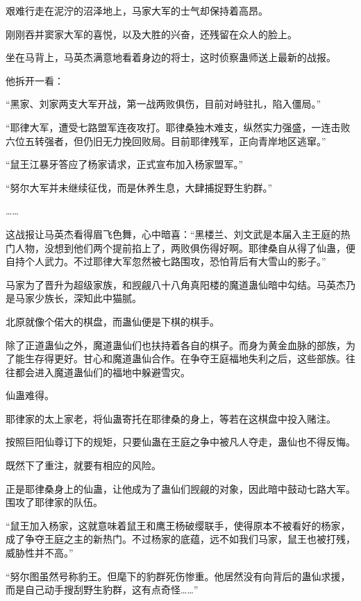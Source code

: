 
\begin{this_body}

艰难行走在泥泞的沼泽地上，马家大军的士气却保持着高昂。

刚刚吞并窦家大军的喜悦，以及大胜的兴奋，还残留在众人的脸上。

坐在马背上，马英杰满意地看着身边的将士，这时侦察蛊师送上最新的战报。

他拆开一看：

“黑家、刘家两支大军开战，第一战两败俱伤，目前对峙驻扎，陷入僵局。”

“耶律大军，遭受七路盟军连夜攻打。耶律桑独木难支，纵然实力强盛，一连击败六位五转强者，但仍旧无力挽回败局。目前耶律残军，正向青岸地区逃窜。”

“鼠王江暴牙答应了杨家请求，正式宣布加入杨家盟军。”

“努尔大军并未继续征伐，而是休养生息，大肆捕捉野生豹群。”

……

这战报让马英杰看得眉飞色舞，心中暗喜：“黑楼兰、刘文武是本届入主王庭的热门人物，没想到他们两个提前掐上了，两败俱伤得好啊。耶律桑自从得了仙蛊，便自持个人武力。不过耶律大军忽然被七路围攻，恐怕背后有大雪山的影子。”

马家为了晋升为超级家族，和觊觎八十八角真阳楼的魔道蛊仙暗中勾结。马英杰乃是马家少族长，深知此中猫腻。

北原就像个偌大的棋盘，而蛊仙便是下棋的棋手。

除了正道蛊仙之外，魔道蛊仙们也扶持着各自的棋子。而身为黄金血脉的部族，为了能生存得更好。甘心和魔道蛊仙合作。在争夺王庭福地失利之后，这些部族。往往都会进入魔道蛊仙们的福地中躲避雪灾。

仙蛊难得。

耶律家的太上家老，将仙蛊寄托在耶律桑的身上，等若在这棋盘中投入赌注。

按照巨阳仙尊订下的规矩，只要仙蛊在王庭之争中被凡人夺走，蛊仙也不得反悔。

既然下了重注，就要有相应的风险。

正是耶律桑身上的仙蛊，让他成为了蛊仙们觊觎的对象，因此暗中鼓动七路大军。围攻了耶律家的队伍。

“鼠王加入杨家，这就意味着鼠王和鹰王杨破缨联手，使得原本不被看好的杨家，成了争夺王庭之主的新热门。不过杨家的底蕴，远不如我们马家，鼠王也被打残，威胁性并不高。”

“努尔图虽然号称豹王。但麾下的豹群死伤惨重。他居然没有向背后的蛊仙求援，而是自己动手搜刮野生豹群，这有点奇怪……”


\end{this_body}

